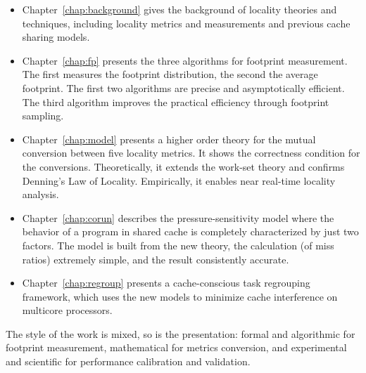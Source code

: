 \begin{itemize}
\item Chapter~\ref{chap:background} gives the background of locality
theories and techniques, including locality metrics and measurements
and previous cache sharing models. 

\item Chapter~\ref{chap:fp} presents the three algorithms for
  footprint measurement.  The first measures the footprint
  distribution, the second the average footprint.  The first two
  algorithms are precise and asymptotically efficient.  The third
  algorithm improves the practical efficiency through footprint
  sampling.

\item Chapter~\ref{chap:model} presents a higher order theory for the
  mutual conversion between five locality metrics.  It shows
  the correctness condition for the conversions.  Theoretically, it extends
  the work-set theory and confirms Denning's Law of Locality.
  Empirically, it enables near real-time locality analysis.

\item Chapter~\ref{chap:corun} describes the pressure-sensitivity
  model where the behavior of a program in shared cache is completely
  characterized by just two factors.  The model is built from the new
  theory, the calculation (of miss ratios) extremely simple, and the
  result consistently accurate.

\item Chapter~\ref{chap:regroup} presents a cache-conscious task
  regrouping framework, which uses the new models to minimize cache
  interference on multicore processors. 
\end{itemize}

The style of the work is mixed, so is the presentation: formal and
algorithmic for footprint measurement, mathematical for metrics
conversion, and experimental and scientific for performance
calibration and validation.

